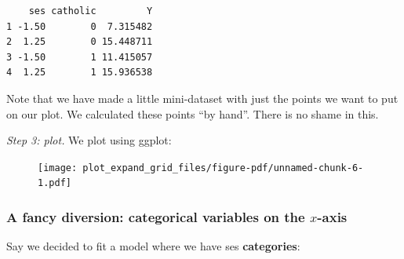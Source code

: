 \documentclass[
  letterpaper,
  DIV=11,
  numbers=noendperiod]{scrreprt}
\newenvironment{Shaded}{\begin{snugshade}}{\end{snugshade}}
\newcommand{\AttributeTok}[1]{\textcolor[rgb]{0.49,0.56,0.16}{#1}}
\newcommand{\ConstantTok}[1]{\textcolor[rgb]{0.53,0.00,0.00}{#1}}
\newcommand{\DecValTok}[1]{\textcolor[rgb]{0.25,0.63,0.44}{#1}}
\newcommand{\FloatTok}[1]{\textcolor[rgb]{0.25,0.63,0.44}{#1}}
\newcommand{\FunctionTok}[1]{\textcolor[rgb]{0.02,0.16,0.49}{#1}}
\newcommand{\NormalTok}[1]{\textcolor[rgb]{0.00,0.44,0.13}{#1}}
\newcommand{\OtherTok}[1]{\textcolor[rgb]{0.00,0.44,0.13}{#1}}
\newcommand{\SpecialCharTok}[1]{\textcolor[rgb]{0.25,0.44,0.63}{#1}}
\newcommand{\StringTok}[1]{\textcolor[rgb]{0.25,0.44,0.63}{#1}}
\begin{document}
\begin{verbatim}
    ses catholic         Y
1 -1.50        0  7.315482
2  1.25        0 15.448711
3 -1.50        1 11.415057
4  1.25        1 15.936538
\end{verbatim}

Note that we have made a little mini-dataset with just the points we
want to put on our plot. We calculated these points ``by hand''. There
is no shame in this.

\emph{Step 3: plot.} We plot using ggplot:

\begin{Shaded}
\end{Shaded}

\begin{figure}[H]

{\centering \texttt{[image: plot\_expand\_grid\_files/figure-pdf/unnamed-chunk-6-1.pdf]}

}

\end{figure}

\hypertarget{a-fancy-diversion-categorical-variables-on-the-x-axis}{%
\subsubsection{\texorpdfstring{A fancy diversion: categorical variables
on the
\(x\)-axis}{A fancy diversion: categorical variables on the x-axis}}\label{a-fancy-diversion-categorical-variables-on-the-x-axis}}

Say we decided to fit a model where we have ses \textbf{categories}:

\begin{Shaded}
\end{Shaded}
\end{document}
